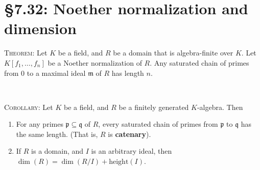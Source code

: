 \documentclass[12pt]{amsart}
\newcommand{\m}{\mathfrak{m}}
\newcommand{\p}{\mathfrak{p}}
\newcommand{\q}{\mathfrak{q}}
\renewcommand{\1}{\mathbbm{1}}
\newcommand{\showsol}[1]{\def\displaysol{#1}}
\begin{document}
\showsol{0}
	
	\thispagestyle{empty}
	
	\section*{\S7.32: Noether normalization and dimension}
	
	\begin{framed}
\noindent	\textsc{Theorem:} Let $K$ be a field, and $R$ be a domain that is algebra-finite over $K$. Let $K[f_1,\dots,f_n]$ be a Noether normalization of $R$. Any saturated chain of primes from $0$ to a maximal ideal $\m$ of $R$ has length $n$.

\

\noindent	\textsc{Corollary:} Let $K$ be a field, and $R$ be a finitely generated $K$-algebra. Then
\begin{enumerate}
\item For any primes $\p \subseteq \q$ of $R$, every saturated chain of primes from $\p$ to $\q$ has the same length. (That is, $R$ is \textbf{catenary}).
\item If $R$ is a domain, and $I$ is an arbitrary ideal, then $\dim(R) = \dim(R/I) + \mathrm{height}(I)$.
\end{enumerate}
\end{framed}
\end{document}
